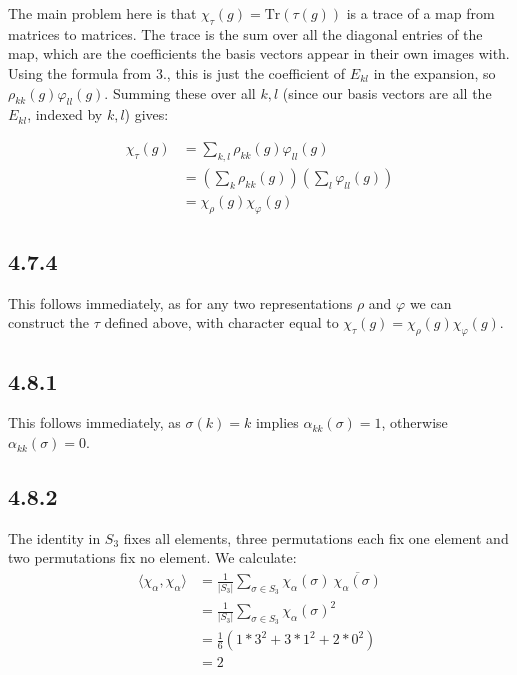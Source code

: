 \documentclass[12pt]{article}
\begin{document}
The main problem here is that $\chi_\tau(g) = \mathrm{Tr}(\tau(g))$ is a trace of a map from matrices to matrices. The trace is the sum over all the diagonal entries of the map, which are the coefficients the basis vectors appear in their own images with. Using the formula from 3., this is just the coefficient of $E_{kl}$ in the expansion, so $\rho_{kk}(g) \varphi_{ll}(g)$. Summing these over all $k,l$ (since our basis vectors are all the $E_{kl}$, indexed by $k,l$) gives:

\begin{equation*}
    \begin{split}
        \chi_\tau(g) &= \sum_{k,l} \rho_{kk}(g) \varphi_{ll}(g)\\
        &= \left( \sum_{k} \rho_{kk}(g) \right) \left( \sum_{l} \varphi_{ll}(g) \right)\\
        &= \chi_\rho(g) \chi_\varphi(g)
    \end{split}
\end{equation*}

\subsection*{4.7.4}

This follows immediately, as for any two representations $\rho$ and $\varphi$ we can construct the $\tau$ defined above, with character equal to $\chi_\tau(g) = \chi_\rho(g) \chi_\varphi(g)$.

\subsection*{4.8.1}

This follows immediately, as $\sigma(k) = k$ implies $\alpha_{kk}(\sigma) = 1$, otherwise $\alpha_{kk}(\sigma) = 0$.

\subsection*{4.8.2}

The identity in $S_3$ fixes all elements, three permutations each fix one element and two permutations fix no element. We calculate:
\begin{equation*}
\begin{split}
\langle \chi_{\alpha}, \chi_{\alpha} \rangle
&= \frac{1}{|S_3|} \sum_{\sigma \in S_3} \chi_{\alpha}(\sigma) \: \overline{\chi_{\alpha}(\sigma)} \\
&= \frac{1}{|S_3|} \sum_{\sigma \in S_3} \chi_{\alpha}(\sigma)^2 \\
&= \frac{1}{6} \left( 1 * 3^2 + 3 * 1^2 + 2 * 0^2 \right) \\
&= 2
\end{split}
\end{equation*}
\end{document}
